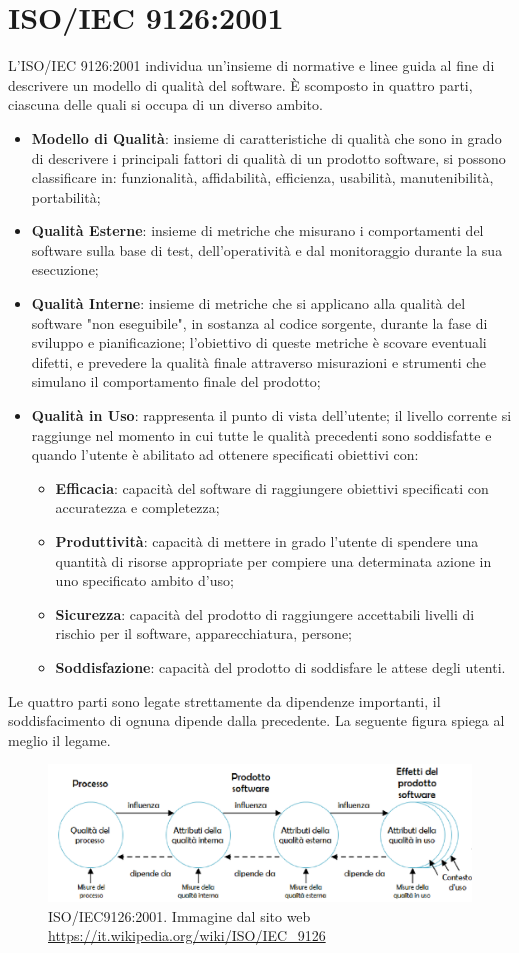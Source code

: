 \section{ISO/IEC 9126:2001}\label{ISO/IEC 9126Section}

L'ISO/IEC 9126:2001 individua un'insieme di normative e linee guida al fine di descrivere un modello di qualità del software. \`E scomposto in quattro parti, ciascuna delle quali si occupa di un diverso ambito. 
\begin{itemize}
	\item \textbf{Modello di Qualità}: insieme di caratteristiche di qualità che sono in grado di descrivere i principali fattori di qualità di un prodotto software, si possono classificare in: funzionalità, affidabilità, efficienza, usabilità, manutenibilità, portabilità;
	\item \textbf{Qualità Esterne}: insieme di metriche che misurano i comportamenti del software sulla base di test, dell'operatività e dal monitoraggio durante la sua esecuzione;
	\item \textbf{Qualità Interne}: insieme di metriche che si applicano alla qualità del software "non eseguibile", in sostanza al codice sorgente, durante la fase di sviluppo e pianificazione; l'obiettivo di queste metriche è scovare eventuali difetti, e prevedere la qualità finale attraverso misurazioni e strumenti che simulano il comportamento finale del prodotto;
	\item \textbf{Qualità in Uso}: rappresenta il punto di vista dell'utente; il livello corrente si raggiunge nel momento in cui tutte le qualità precedenti sono soddisfatte e quando l'utente è abilitato ad ottenere specificati obiettivi con:
	\begin{itemize}
		\item \textbf{Efficacia}: capacità del software di raggiungere obiettivi specificati con accuratezza e completezza;
		\item \textbf{Produttività}: capacità di mettere in grado l'utente di spendere una quantità di risorse appropriate per compiere una determinata azione in uno specificato ambito d'uso;
		\item \textbf{Sicurezza}: capacità del prodotto di raggiungere accettabili livelli di rischio per il software, apparecchiatura, persone;
		\item \textbf{Soddisfazione}: capacità del prodotto di soddisfare le attese degli utenti.
	\end{itemize}	
\end{itemize}
Le quattro parti sono legate strettamente da dipendenze importanti, il soddisfacimento di ognuna dipende dalla precedente. La seguente figura spiega al meglio il legame.

\begin{figure}[H]
\centering

	\includegraphics[width=0.9\linewidth]{./images/quality_cicle_iso9126.png} 
	\caption{ISO/IEC9126:2001. Immagine dal sito web \url{https://it.wikipedia.org/wiki/ISO/IEC_9126}}
	\label{ISO/IEC9126:2001}	

\end{figure}

 